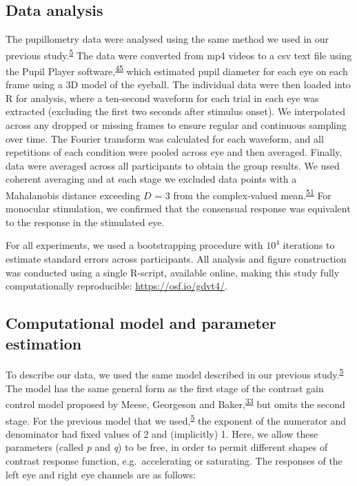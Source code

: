 \documentclass[
]{article}
\begin{document}
\hypertarget{data-analysis}{%
\subsection{Data analysis}\label{data-analysis}}

The pupillometry data were analysed using the same method we used in our previous study.\textsuperscript{\protect\hyperlink{ref-Segala2023}{5}} The data were converted from mp4 videos to a csv text file using the Pupil Player software,\textsuperscript{\protect\hyperlink{ref-Kassner2014}{45}} which estimated pupil diameter for each eye on each frame using a 3D model of the eyeball. The individual data were then loaded into R for analysis, where a ten-second waveform for each trial in each eye was extracted (excluding the first two seconds after stimulus onset). We interpolated across any dropped or missing frames to ensure regular and continuous sampling over time. The Fourier transform was calculated for each waveform, and all repetitions of each condition were pooled across eye and then averaged. Finally, data were averaged across all participants to obtain the group results. We used coherent averaging and at each stage we excluded data points with a Mahalanobis distance exceeding \(D\) = 3 from the complex-valued mean.\textsuperscript{\protect\hyperlink{ref-Baker2021}{51}} For monocular stimulation, we confirmed that the consensual response was equivalent to the response in the stimulated eye.

For all experiments, we used a bootstrapping procedure with \ensuremath{10^{4}} iterations to estimate standard errors across participants. All analysis and figure construction was conducted using a single R-script, available online, making this study fully computationally reproducible: \url{https://osf.io/gdvt4/}.

\hypertarget{computational-model-and-parameter-estimation}{%
\subsection{Computational model and parameter estimation}\label{computational-model-and-parameter-estimation}}

To describe our data, we used the same model described in our previous study.\textsuperscript{\protect\hyperlink{ref-Segala2023}{5}} The model has the same general form as the first stage of the contrast gain control model proposed by Meese, Georgeson and Baker,\textsuperscript{\protect\hyperlink{ref-Meese2006}{33}} but omits the second stage. For the previous model that we used,\textsuperscript{\protect\hyperlink{ref-Segala2023}{5}} the exponent of the numerator and denominator had fixed values of 2 and (implicitly) 1. Here, we allow these parameters (called \emph{p} and \emph{q}) to be free, in order to permit different shapes of contrast response function, e.g.~accelerating or saturating. The responses of the left eye and right eye channels are as follows:
\end{document}
